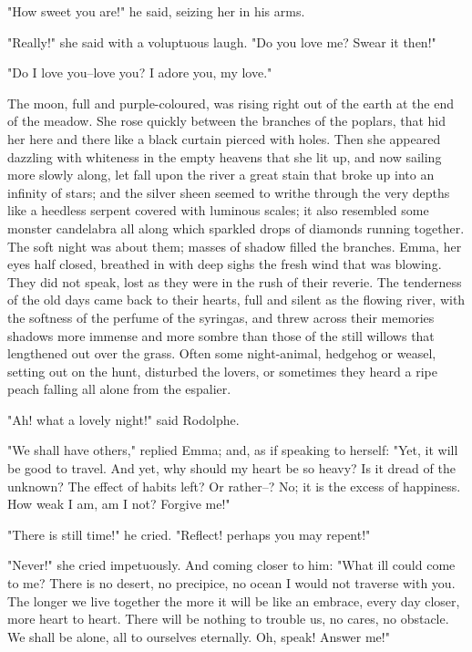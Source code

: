 \documentclass[11pt,twocolumn]{ltugboat}
\begin{document}
"How sweet you are!" he said, seizing her in his arms.

"Really!" she said with a voluptuous laugh. "Do you love me? Swear it
then!"

"Do I love you--love you? I adore you, my love."

The moon, full and purple-coloured, was rising right out of the earth
at the end of the meadow. She rose quickly between the branches of the
poplars, that hid her here and there like a black curtain pierced with
holes. Then she appeared dazzling with whiteness in the empty heavens
that she lit up, and now sailing more slowly along, let fall upon the
river a great stain that broke up into an infinity of stars; and the
silver sheen seemed to writhe through the very depths like a heedless
serpent covered with luminous scales; it also resembled some monster
candelabra all along which sparkled drops of diamonds running together.
The soft night was about them; masses of shadow filled the branches.
Emma, her eyes half closed, breathed in with deep sighs the fresh wind
that was blowing. They did not speak, lost as they were in the rush of
their reverie. The tenderness of the old days came back to their hearts,
full and silent as the flowing river, with the softness of the perfume
of the syringas, and threw across their memories shadows more immense
and more sombre than those of the still willows that lengthened out over
the grass. Often some night-animal, hedgehog or weasel, setting out on
the hunt, disturbed the lovers, or sometimes they heard a ripe peach
falling all alone from the espalier.

"Ah! what a lovely night!" said Rodolphe.

"We shall have others," replied Emma; and, as if speaking to herself:
"Yet, it will be good to travel. And yet, why should my heart be
so heavy? Is it dread of the unknown? The effect of habits left? Or
rather--? No; it is the excess of happiness. How weak I am, am I not?
Forgive me!"

"There is still time!" he cried. "Reflect! perhaps you may repent!"

"Never!" she cried impetuously. And coming closer to him: "What ill
could come to me? There is no desert, no precipice, no ocean I would not
traverse with you. The longer we live together the more it will be like
an embrace, every day closer, more heart to heart. There will be
nothing to trouble us, no cares, no obstacle. We shall be alone, all to
ourselves eternally. Oh, speak! Answer me!"
\end{document}
